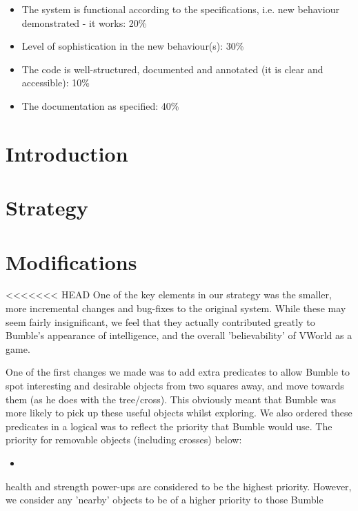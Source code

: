 \documentclass[a4paper,oneside]{report}
\begin{document}
\begin{itemize}
\item The system is functional according to the specifications, i.e. new behaviour demonstrated - it works: 20\%
\item Level of sophistication in the new behaviour(s): 30\%
\item The code is well-structured, documented and annotated (it is clear and accessible): 10\%
\item The documentation as specified: 40\%
\end{itemize}





\section{Introduction}

\section{Strategy}

\section{Modifications}

<<<<<<< HEAD
One of the key elements in our strategy was the smaller, more incremental changes and bug-fixes to the original system. While these may seem fairly insignificant, we feel that they actually contributed greatly to Bumble's appearance of intelligence, and the overall 'believability' of VWorld as a game.

One of the first changes we made was to add extra predicates to allow Bumble to spot interesting and desirable objects from two squares away, and move towards them (as he does with the tree/cross). This obviously meant that Bumble was more likely to pick up these useful objects whilst exploring. We also ordered these predicates in a logical was to reflect the priority that Bumble would use. The priority for removable objects (including crosses) below:

\begin{itemize}
	\item 
\end{itemize}


 health and strength power-ups are considered to be the highest priority. However, we consider any 'nearby' objects to be of a higher priority to those Bumble 
\end{document}
